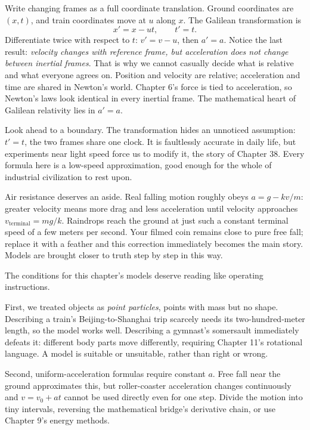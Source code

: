 \begin{challenge}
Write changing frames as a full coordinate translation. Ground coordinates are \((x,t)\), and train coordinates move at \(u\) along \(x\). The Galilean transformation is
\[
  x'=x-ut,\qquad t'=t.
\]
Differentiate twice with respect to \(t\): \(v'=v-u\), then \(a'=a\). Notice the last result: \emph{velocity changes with reference frame, but acceleration does not change between inertial frames}. That is why we cannot casually decide what is relative and what everyone agrees on. Position and velocity are relative; acceleration and time are shared in Newton's world. Chapter 6's force is tied to acceleration, so Newton's laws look identical in every inertial frame. The mathematical heart of Galilean relativity lies in \(a'=a\).

Look ahead to a boundary. The transformation hides an unnoticed assumption: \(t'=t\), the two frames share one clock. It is faultlessly accurate in daily life, but experiments near light speed force us to modify it, the story of Chapter 38. Every formula here is a low-speed approximation, good enough for the whole of industrial civilization to rest upon.

Air resistance deserves an aside. Real falling motion roughly obeys \(a=g-kv/m\): greater velocity means more drag and less acceleration until velocity approaches \(v_{\text{terminal}}=mg/k\). Raindrops reach the ground at just such a constant terminal speed of a few meters per second. Your filmed coin remains close to pure free fall; replace it with a feather and this correction immediately becomes the main story. Models are brought closer to truth step by step in this way.
\end{challenge}


The conditions for this chapter's models deserve reading like operating instructions.

First, we treated objects as \emph{point particles}, points with mass but no shape. Describing a train's Beijing-to-Shanghai trip scarcely needs its two-hundred-meter length, so the model works well. Describing a gymnast's somersault immediately defeats it: different body parts move differently, requiring Chapter 11's rotational language. A model is suitable or unsuitable, rather than right or wrong.

Second, uniform-acceleration formulas require constant \(a\). Free fall near the ground approximates this, but roller-coaster acceleration changes continuously and \(v=v_0+at\) cannot be used directly even for one step. Divide the motion into tiny intervals, reversing the mathematical bridge's derivative chain, or use Chapter 9's energy methods.

